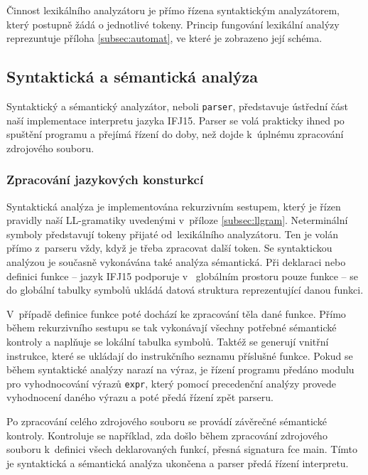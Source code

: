 \documentclass[a4paper, 12pt]{article}
\begin{document}
Činnost lexikálního analyzátoru je přímo řízena
syntaktickým analyzátorem, který postupně žádá o jednotlivé tokeny. Princip
fungování lexikální analýzy reprezuntuje příloha \ref{subsec:automat},
ve které je zobrazeno její schéma.

\subsection{Syntaktická a sémantická analýza} \label{parser}

Syntaktický a sémantický analyzátor, neboli \texttt{parser}, představuje ústřední
část naší implementace interpretu jazyka IFJ15. Parser se volá prakticky ihned po
spuštění programu a přejímá řízení do doby, než dojde k~úplnému zpracování
zdrojového souboru.

\subsubsection{Zpracování jazykových konsturkcí}
Syntaktická analýza je implementována rekurzivním sestupem, který je řízen
pravidly naší LL-gramatiky uvedenými v~příloze \ref{subsec:llgram}.
Neterminální symboly představují tokeny přijaté od~lexikálního analyzátoru.
Ten je volán přímo z~parseru vždy, když je třeba
zpracovat další token. Se syntaktickou analýzou je současně vykonávána také
analýza sémantická. Při deklaraci nebo definici funkce -- jazyk IFJ15 podporuje v~
globálním prostoru pouze funkce -- se do globální tabulky symbolů ukládá datová
struktura reprezentující danou funkci.

V~případě definice funkce poté dochází ke zpracování těla dané funkce.
Přímo během rekurzivního sestupu se tak vykonávají všechny potřebné
sémantické kontroly a naplňuje se lokální tabulka symbolů. Taktéž se generují
vnitřní instrukce, které se ukládají do instrukčního seznamu příslušné funkce.
Pokud se během syntaktické analýzy narazí na výraz, je řízení programu předáno
modulu pro vyhodnocování výrazů \texttt{expr}, který pomocí precedenční analýzy
provede vyhodnocení daného výrazu a poté předá řízení zpět parseru.

Po zpracování celého zdrojového souboru se provádí závěrečné sémantické
kontroly. Kontroluje se například, zda došlo během zpracování zdrojového
souboru k~definici všech deklarovaných funkcí, přesná signatura fce main.
Tímto je syntaktická a sémantická analýza ukončena a parser předá řízení interpretu.
\end{document}
